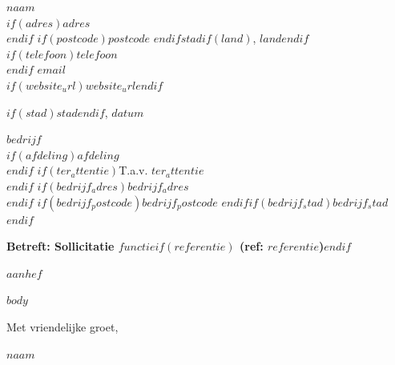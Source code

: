\documentclass[a4paper, 11pt]{article}
\begin{document}
\begin{flushright}
\textbf{$naam$}\\
$if(adres)$$adres$\\$endif$%
$if(postcode)$$postcode$ $endif$$stad$$if(land)$, $land$$endif$\\
\vspace{0.2em}
$if(telefoon)$$telefoon$\\$endif$%
\href{mailto:$email$}{$email$}\\
$if(website_url)$\href{https://$website_url$}{$website_url$}$endif$
\end{flushright}

\vspace{0.4cm}

\begin{flushright}
$if(stad)$$stad$$endif$, $datum$
\end{flushright}

\vspace{0.7cm}

\textbf{$bedrijf$}\\
$if(afdeling)$$afdeling$\\$endif$%
$if(ter_attentie)$T.a.v. $ter_attentie$\\$endif$%
$if(bedrijf_adres)$$bedrijf_adres$\\$endif$%
$if(bedrijf_postcode)$$bedrijf_postcode$ $endif$$if(bedrijf_stad)$$bedrijf_stad$$endif$

\vspace{0.7cm}

\textbf{Betreft: Sollicitatie $functie$$if(referentie)$ \textnormal{(ref: $referentie$)}$endif$}

\vspace{0.7cm}

$aanhef$

\vspace{0.3em}

$body$

\vspace{1.2cm}

Met vriendelijke groet,

\vspace{2.0cm}

\textbf{$naam$}
\end{document}
